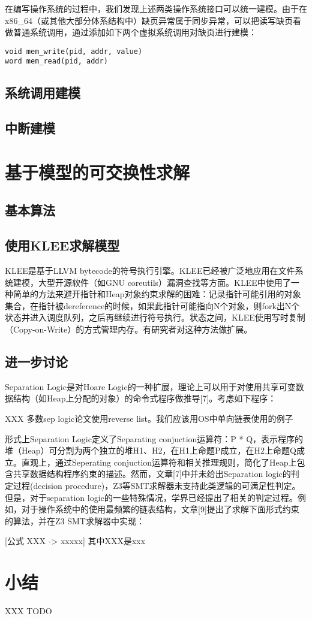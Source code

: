 在编写操作系统的过程中，我们发现上述两类操作系统接口可以统一建模。由于在x86\_64（或其他大部分体系结构中）缺页异常属于同步异常\cite{intelsys}，可以把读写缺页看做普通系统调用，通过添加如下两个虚拟系统调用对缺页进行建模：

\begin{verbatim}
void mem_write(pid, addr, value)
word mem_read(pid, addr)
\end{verbatim}

\subsection{系统调用建模}

\subsection{中断建模}

\section{基于模型的可交换性求解}

\subsection{基本算法}

\subsection{使用KLEE求解模型}
KLEE是基于LLVM
bytecode的符号执行引擎。KLEE已经被广泛地应用在文件系统建模，大型开源软件（如GNU
coreutils）漏洞查找\cite{Cadar:2008:KUA:1855741.1855756}等方面。KLEE中使用了一种简单的方法来避开指针和Heap对象约束求解的困难：记录指针可能引用的对象集合，在指针被dereference的时候，如果此指针可能指向N个对象，则fork出N个状态并进入调度队列，之后再继续进行符号执行。状态之间，KLEE使用写时复制（Copy-on-Write）的方式管理内存。有研究者对这种方法做扩展。


\subsection{进一步讨论}
Separation Logic是对Hoare
Logic的一种扩展，理论上可以用于对使用共享可变数据结构（如Heap上分配的对象）的命令式程序做推导[7]。考虑如下程序：

XXX 多数sep logic论文使用reverse list。我们应该用OS中单向链表使用的例子

形式上Separation Logic定义了Separating conjuction运算符：P *
Q，表示程序的堆（Heap）可分割为两个独立的堆H1、H2，在H1上命题P成立，在H2上命题Q成立。直观上，通过Seperating
conjuction运算符和相关推理规则，简化了Heap上包含共享数据结构程序约束的描述。然而，文章[7]中并未给出Separation
logic的判定过程(decision
procedure)，Z3等SMT求解器未支持此类逻辑的可满足性判定。但是，对于separation
logic的一些特殊情况，学界已经提出了相关的判定过程。例如，对于操作系统中的使用最频繁的链表结构，文章[9]提出了求解下面形式约束的算法，并在Z3
SMT求解器中实现：

[公式 XXX -> xxxxx]
其中XXX是xxx


\section{小结}
XXX TODO

